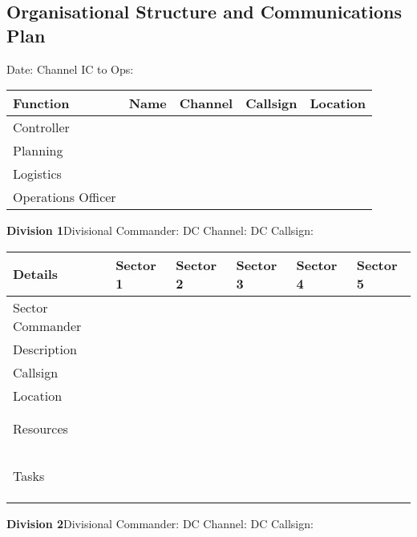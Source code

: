 {%
{%
{%
{%
\begin{landscape}
{%
\section{Organisational Structure and Communications Plan}
{\Large{}
\noindent
Date:  \hfill Channel IC to Ops:  \hfill \quad \\
}\vfill
{\large{}
\begin{tabu}{ p{0.2\pdfpagewidth} | lll | p{0.4\pdfpagewidth} }
Function & Name & Channel & Callsign & Location \\
\midrule
Controller &  &  &  &  \\
\midrule
Planning &  &  &  &  \\
\midrule
Logistics &  &  &  &  \\
\midrule
Operations Officer &  &  &  &  \\
\bottomrule
\end{tabu}
}\vfill
{\large{}
    \textbf{Division 1}\hfill Divisional Commander:  \hfill DC Channel:  \hfill DC Callsign: \hfill\quad  \\
}
\begin{tabu}{ p{0.15\pdfpagewidth} | p{0.18\pdfpagewidth} | p{0.18\pdfpagewidth} | p{0.18\pdfpagewidth} | p{0.18\pdfpagewidth} | p{0.18\pdfpagewidth} }
\toprule
Details & Sector 1 & Sector 2 & Sector 3 & Sector 4 & Sector 5 \\
\midrule
Sector Commander & & & & & \\
Description & & & & & \\
Callsign & & & & & \\
\midrule
Location & & & & & \\
& & & & & \\
& & & & & \\
\midrule
Resources & & & & & \\
& & & & & \\
& & & & & \\
& & & & & \\
& & & & & \\
& & & & & \\
\midrule
Tasks & & & & & \\
& & & & & \\
& & & & & \\
& & & & & \\
\bottomrule
\end{tabu}
\clearpage
\textbf{Division 2}\hfill Divisional Commander:  \hfill DC Channel:  \hfill DC Callsign: \hfill\quad \\
}
\end{landscape}}}}}

